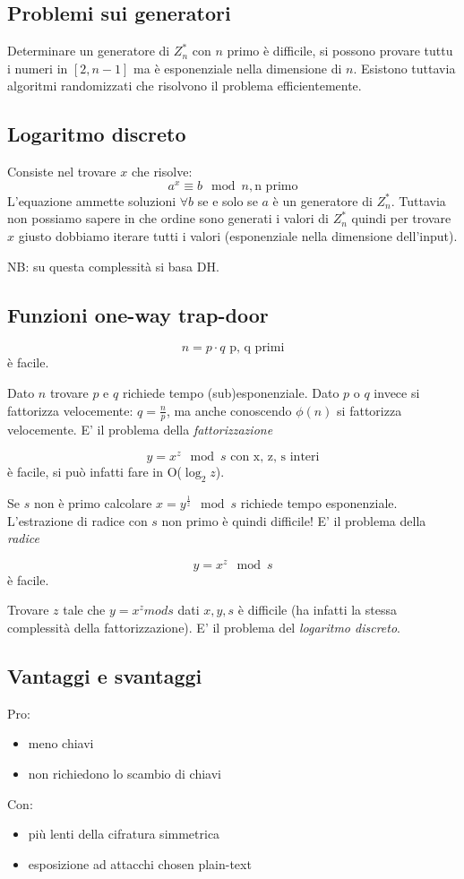 \subsection{Problemi sui generatori}
Determinare un generatore di $Z_n^*$ con $n$ primo è difficile, si possono provare tuttu i numeri in $[2, n-1]$ ma è esponenziale nella dimensione di $n$.
Esistono tuttavia algoritmi randomizzati che risolvono il problema efficientemente.

\subsection{Logaritmo discreto}
Consiste nel trovare $x$ che risolve:
$$ a^x \equiv b \mod n, \text{n primo} $$
L'equazione ammette soluzioni $\forall b$ se e solo se $a$ è un generatore di $Z_n^*$.
Tuttavia non possiamo sapere in che ordine sono generati i valori di $Z_n^*$ quindi per trovare $x$ giusto dobbiamo iterare tutti i valori (esponenziale nella dimensione dell'input).

NB: su questa complessità si basa DH.

\subsection{Funzioni one-way trap-door}
$$ n = p \cdot q \text{ p, q primi} $$
è facile.

Dato $n$ trovare $p$ e $q$ richiede tempo (sub)esponenziale. Dato $p$ o $q$ invece si fattorizza velocemente: $q = \frac{n}{p}$, ma anche conoscendo $\phi(n)$ si fattorizza velocemente. E' il problema della \emph{fattorizzazione}

$$ y = x^z \mod s \text{ con x, z, s interi} $$
è facile, si può infatti fare in O($\log_2z$).

Se $s$ non è primo calcolare $x = y^{\frac{1}{z}} \mod s$ richiede tempo esponenziale.
L'estrazione di radice con $s$ non primo è quindi difficile! E' il problema della \emph{radice}

$$y = x^z \mod s $$
è facile.

Trovare $z$ tale che $y = x^z mod s$ dati $x, y, s$ è difficile (ha infatti la stessa complessità della fattorizzazione). E' il problema del \emph{logaritmo discreto}.

\subsection{Vantaggi e svantaggi}
Pro:
\begin{itemize}
    \item meno chiavi
    \item non richiedono lo scambio di chiavi
\end{itemize}
Con:
\begin{itemize}
    \item più lenti della cifratura simmetrica
    \item esposizione ad attacchi chosen plain-text
\end{itemize}

